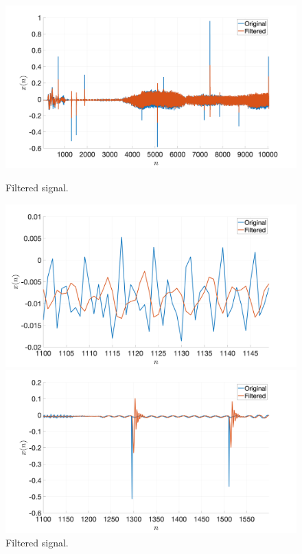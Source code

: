 \documentclass[]{scrartcl}
\begin{document}
\begin{figure}[htbp]
	\centering
	\begin{minipage}[b]{.49\textwidth}
		\centering
		\includegraphics[width= 1.1\textwidth]{figures/R2c.png}
		\caption{Filtered signal.}
		\label{fig:R2c}
	\end{minipage}
	\hfill
	\begin{minipage}[b]{.49\textwidth}
		\centering
		\includegraphics[width= 1.1\textwidth]{figures/R2c_smallAmp.png}
		\caption{Filtered signal.}
		\label{fig:R2c_smallAmp}
	\end{minipage}
\begin{minipage}[b]{.49\textwidth}
	\centering
	\includegraphics[width= 1.1\textwidth]{figures/R2c_zoomNoise.png}

\end{minipage}
\end{figure}
\end{document}
